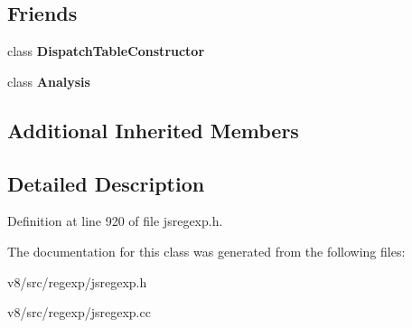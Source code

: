 \subsection*{Friends}
\begin{DoxyCompactItemize}
\item 
\mbox{\label{classv8_1_1internal_1_1ChoiceNode_ab1c57f90b7cb7e0e0c0a088d6a0f8f6c}} 
class {\bfseries Dispatch\+Table\+Constructor}
\item 
\mbox{\label{classv8_1_1internal_1_1ChoiceNode_a1e23f70a55de946d03c863586003862d}} 
class {\bfseries Analysis}
\end{DoxyCompactItemize}
\subsection*{Additional Inherited Members}


\subsection{Detailed Description}


Definition at line 920 of file jsregexp.\+h.



The documentation for this class was generated from the following files\+:\begin{DoxyCompactItemize}
\item 
v8/src/regexp/jsregexp.\+h\item 
v8/src/regexp/jsregexp.\+cc\end{DoxyCompactItemize}
